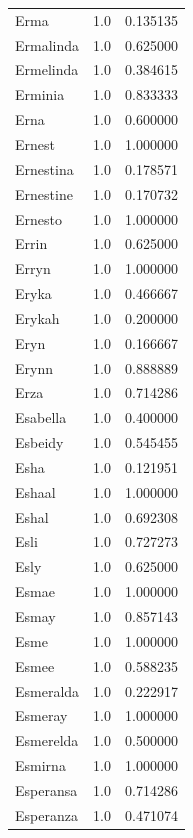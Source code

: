 \documentclass[
  letterpaper,
  DIV=11,
  numbers=noendperiod]{scrreprt}
\begin{document}
\begin{tabular}{lrr}
Erma            &   1.0 &   0.135135 \\
Ermalinda       &   1.0 &   0.625000 \\
Ermelinda       &   1.0 &   0.384615 \\
Erminia         &   1.0 &   0.833333 \\
Erna            &   1.0 &   0.600000 \\
Ernest          &   1.0 &   1.000000 \\
Ernestina       &   1.0 &   0.178571 \\
Ernestine       &   1.0 &   0.170732 \\
Ernesto         &   1.0 &   1.000000 \\
Errin           &   1.0 &   0.625000 \\
Erryn           &   1.0 &   1.000000 \\
Eryka           &   1.0 &   0.466667 \\
Erykah          &   1.0 &   0.200000 \\
Eryn            &   1.0 &   0.166667 \\
Erynn           &   1.0 &   0.888889 \\
Erza            &   1.0 &   0.714286 \\
Esabella        &   1.0 &   0.400000 \\
Esbeidy         &   1.0 &   0.545455 \\
Esha            &   1.0 &   0.121951 \\
Eshaal          &   1.0 &   1.000000 \\
Eshal           &   1.0 &   0.692308 \\
Esli            &   1.0 &   0.727273 \\
Esly            &   1.0 &   0.625000 \\
Esmae           &   1.0 &   1.000000 \\
Esmay           &   1.0 &   0.857143 \\
Esme            &   1.0 &   1.000000 \\
Esmee           &   1.0 &   0.588235 \\
Esmeralda       &   1.0 &   0.222917 \\
Esmeray         &   1.0 &   1.000000 \\
Esmerelda       &   1.0 &   0.500000 \\
Esmirna         &   1.0 &   1.000000 \\
Esperansa       &   1.0 &   0.714286 \\
Esperanza       &   1.0 &   0.471074 \\

\end{tabular}
\end{document}
